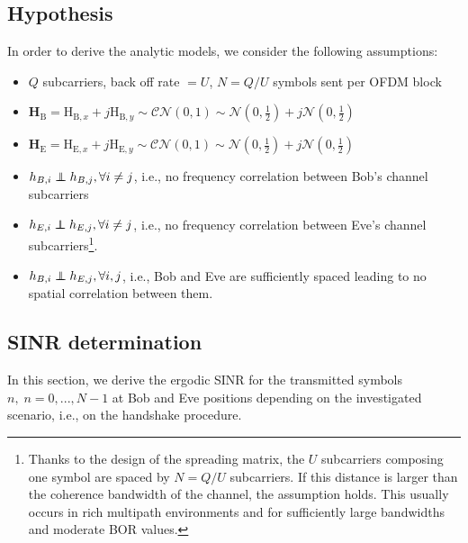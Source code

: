 \documentclass[journal,comsoc]{IEEEtran}
\newcommand{\HE}{\textbf{H}_{\text{E}}}
\newcommand{\HB}{\textbf{H}_{\text{B}}}
\newcommand{\mat}[1]{\boldsymbol{\mathrm{#1}}}
\newcommand\independent{\protect\mathpalette{\protect\independenT}{\perp}}
\def\independenT#1#2{\mathrel{\rlap{$#1#2$}\mkern2mu{#1#2}}}
\begin{document}
\subsection{Hypothesis}
In order to derive the analytic models, we consider the following assumptions:
\begin{itemize}
	\item $Q$ subcarriers, back off rate $= U$, $N = Q/U$ symbols sent per OFDM block
	\item  $\HB = \mat{H}_{\text{B},x} + j\mat{H}_{\text{B},y} \sim \mathcal{CN}(0,1) \sim \mathcal{N}(0,\frac{1}{2}) + j \mathcal{N}(0,\frac{1}{2}) $
	\item  $\HE = \mat{H}_{\text{E},x} + j\mat{H}_{\text{E},y} \sim \mathcal{CN}(0,1) \sim \mathcal{N}(0,\frac{1}{2}) + j \mathcal{N}(0,\frac{1}{2}) $
	\item $h_{B,i} \independent h_{B,j}, \forall i \neq j$, i.e., no frequency correlation between Bob's channel subcarriers
	\item $h_{E,i} \independent h_{E,j}, \forall i \neq j$, i.e., no frequency correlation between Eve's channel subcarriers\footnote{Thanks to the design of the spreading matrix, the $U$ subcarriers composing one symbol are spaced by $N = Q/U$ subcarriers. If this distance is larger than the coherence bandwidth of the channel, the assumption holds. This usually occurs in rich multipath environments and for sufficiently large bandwidths and moderate BOR values.}.
	\item $h_{B,i} \independent h_{E,j}, \forall i,j$, i.e., Bob and Eve are sufficiently spaced leading to no spatial correlation between them.
\end{itemize}


\subsection{SINR determination}
In this section, we derive the ergodic SINR for the transmitted symbols $n, \; n = 0,...,N-1$ at Bob and Eve positions depending on the investigated scenario, i.e., on the handshake procedure. 



\end{document}
